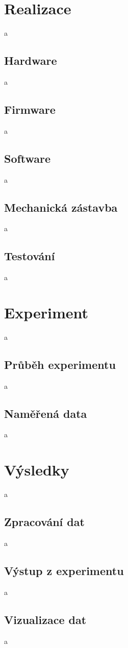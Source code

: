 \documentclass[twoside]{ctuthesis}
\theoremstyle{plain}
\theoremstyle{definition}
\theoremstyle{note}
\begin{document}
\chapter{Realizace}
a
\section{Hardware}
a
\section{Firmware}
a
\section{Software}
a
\section{Mechanická zástavba}
a
\section{Testování}
a




\chapter{Experiment}
a
\section{Průběh experimentu}
a
\section{Naměřená data}
a


\chapter{Výsledky}
a

\section{Zpracování dat}
a

\section{Výstup z experimentu}
a

\section{Vizualizace dat}
a
\end{document}
